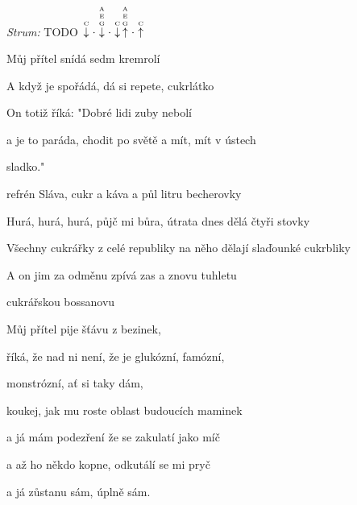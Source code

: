 \begin{song}


 \quad
\textit{Strum:} TODO $\PluckDown{C}\Miss\PluckDown{A E G}\Miss\PluckDown{C}\PluckUp{A E G}\Miss\PluckUp{C}$

\large


\large

\bigskip

Můj přítel  snídá sedm kremrolí  \par
A když je spořádá, dá si repete, cukrlátko  \par
On totiž říká:  "Dobré lidi zuby nebolí  \par
a je to paráda, chodit po světě a mít, mít v ústech \par
{}sladko."    \par

\bigskip

\begin{chorusboxwide}{refrén}
Sláva,  cukr a káva a půl litru becherovky \par
{}Hurá, hurá, hurá, půjč mi bůra, útrata dnes dělá čtyři stovky \par
Všechny cukrářky z celé  republiky na něho dělají slaďounké cukrbliky \par
A on jim za odměnu zpívá zas a znovu tuhletu  \par
cukrářskou bossanovu    \par
\end{chorusboxwide}

\bigskip

Můj přítel  pije šťávu z bezinek,  \par
říká, že nad ni není, že je glukózní, famózní, \par
{}monstrózní, ať si taky dám, \par
koukej, jak mu roste  oblast budoucích maminek  \par
a já mám podezření že se zakulatí jako míč \par
a až ho někdo kopne, odkutálí se mi pryč \par
a já zůstanu sám,  úplně sám.  \par


\end{song}
